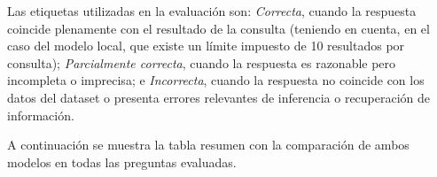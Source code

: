 Las etiquetas utilizadas en la evaluación son: \textit{Correcta}, cuando la respuesta coincide plenamente con el resultado de la consulta (teniendo en cuenta, en el caso del modelo local, que existe un límite impuesto de 10 resultados por consulta); \textit{Parcialmente correcta}, cuando la respuesta es razonable pero incompleta o imprecisa; e \textit{Incorrecta}, cuando la respuesta no coincide con los datos del dataset o presenta errores relevantes de inferencia o recuperación de información.

A continuación se muestra la tabla resumen con la comparación de ambos modelos en todas las preguntas evaluadas.


